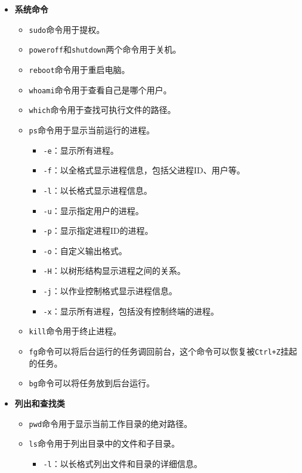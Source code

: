 \documentclass[../main.tex]{subfiles}
\begin{document}
\begin{itemize}
  \item \textbf{系统命令}
    \begin{itemize}
      \item \texttt{sudo}命令用于提权。
      \item \texttt{poweroff}和\texttt{shutdown}两个命令用于关机。
      \item \texttt{reboot}命令用于重启电脑。
      \item \texttt{whoami}命令用于查看自己是哪个用户。
      \item \texttt{which}命令用于查找可执行文件的路径。
      \item \texttt{ps}命令用于显示当前运行的进程。
        \begin{itemize}
          \item \texttt{-e}：显示所有进程。
          \item \texttt{-f}：以全格式显示进程信息，包括父进程ID、用户等。
          \item \texttt{-l}：以长格式显示进程信息。
          \item \texttt{-u}：显示指定用户的进程。
          \item \texttt{-p}：显示指定进程ID的进程。
          \item \texttt{-o}：自定义输出格式。
          \item \texttt{-H}：以树形结构显示进程之间的关系。
          \item \texttt{-j}：以作业控制格式显示进程信息。
          \item \texttt{-x}：显示所有进程，包括没有控制终端的进程。
        \end{itemize}
      \item \texttt{kill}命令用于终止进程。
      \item \texttt{fg}命令可以将后台运行的任务调回前台，这个命令可以恢复被\texttt{Ctrl+Z}挂起的任务。
      \item \texttt{bg}命令可以将任务放到后台运行。
    \end{itemize}
  \item \textbf{列出和查找类}
    \begin{itemize}
      \item \texttt{pwd}命令用于显示当前工作目录的绝对路径。
      \item \texttt{ls}命令用于列出目录中的文件和子目录。
        \begin{itemize}
          \item \texttt{-l}：以长格式列出文件和目录的详细信息。

\end{itemize}
\end{itemize}
\end{itemize}
\end{document}
